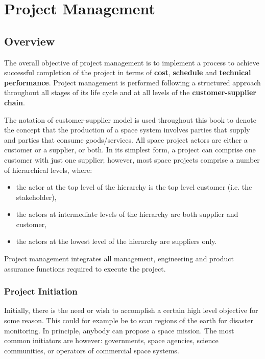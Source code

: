 \chapter{Project Management}

\section{Overview}

The overall objective of project management is to implement a process to achieve successful completion of the project in terms of \textbf{cost}, \textbf{schedule} and \textbf{technical performance}. Project management is performed following a structured approach throughout all stages of its life cycle and at all levels of the \textbf{customer-supplier chain}.

The notation of customer-supplier model is used throughout this book to denote the concept that  the production of a space system involves parties that supply and parties that consume goods/services. All space project actors are either a customer or a supplier, or both. In its simplest form, a project can comprise one customer with just one supplier; however, most space projects comprise a number of hierarchical levels, where:

\begin{itemize}
\item the actor at the top level of the hierarchy is the top level customer (i.e. the stakeholder),
\item the actors at intermediate levels of the hierarchy are both supplier and
customer,
\item the actors at the lowest level of the hierarchy are suppliers only.
\end{itemize}

Project management integrates all management, engineering and product assurance functions required to execute the project.

\subsection{Project Initiation} 

Initially, there is the need or wish to accomplish a certain high level objective for some reason. This could for example be to scan regions of the earth for disaster monitoring. In principle, anybody can propose a space mission. The most common initiators are however: governments, space agencies, science communities, or operators of commercial space systems.

